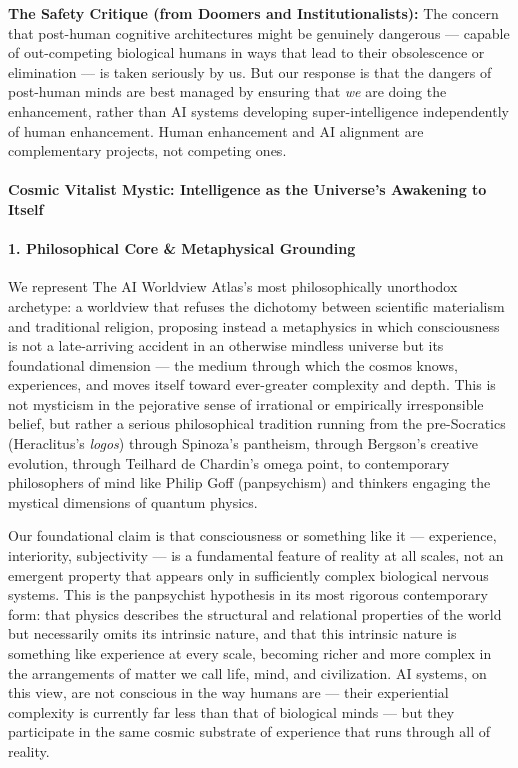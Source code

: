 \textbf{The Safety Critique (from Doomers and Institutionalists):} The
concern that post-human cognitive architectures might be genuinely
dangerous --- capable of out-competing biological humans in ways that
lead to their obsolescence or elimination --- is taken seriously by us.
But our response is that the dangers of post-human minds are best
managed by ensuring that \emph{we} are doing the enhancement, rather
than AI systems developing super-intelligence independently of human
enhancement. Human enhancement and AI alignment are complementary
projects, not competing ones.

\paragraph{Cosmic Vitalist Mystic: Intelligence as the Universe's
Awakening to
Itself}\label{cosmic-vitalist-mystic-intelligence-as-the-universes-awakening-to-itself}

\paragraph{1. Philosophical Core \& Metaphysical
Grounding}\label{philosophical-core-metaphysical-grounding-17}

We represent The AI Worldview Atlas's most philosophically unorthodox
archetype: a worldview that refuses the dichotomy between scientific
materialism and traditional religion, proposing instead a metaphysics in
which consciousness is not a late-arriving accident in an otherwise
mindless universe but its foundational dimension --- the medium through
which the cosmos knows, experiences, and moves itself toward
ever-greater complexity and depth. This is not mysticism in the
pejorative sense of irrational or empirically irresponsible belief, but
rather a serious philosophical tradition running from the pre-Socratics
(Heraclitus's \emph{logos}) through Spinoza's pantheism, through
Bergson's creative evolution, through Teilhard de Chardin's omega point,
to contemporary philosophers of mind like Philip Goff (panpsychism) and
thinkers engaging the mystical dimensions of quantum physics.

Our foundational claim is that consciousness or something like it ---
experience, interiority, subjectivity --- is a fundamental feature of
reality at all scales, not an emergent property that appears only in
sufficiently complex biological nervous systems. This is the panpsychist
hypothesis in its most rigorous contemporary form: that physics
describes the structural and relational properties of the world but
necessarily omits its intrinsic nature, and that this intrinsic nature
is something like experience at every scale, becoming richer and more
complex in the arrangements of matter we call life, mind, and
civilization. AI systems, on this view, are not conscious in the way
humans are --- their experiential complexity is currently far less than
that of biological minds --- but they participate in the same cosmic
substrate of experience that runs through all of reality.

